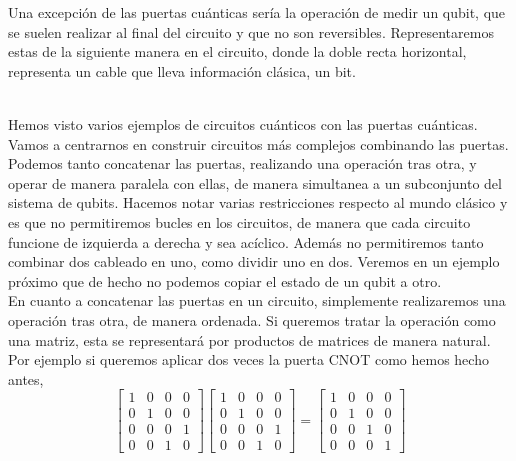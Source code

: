 \documentclass[a4paper]{article}
\numberwithin{equation}{section}
\begin{document}
Una excepción de las puertas cuánticas sería la operación de medir un qubit, que se suelen realizar al final del circuito y que no son reversibles. Representaremos estas de la siguiente manera en el circuito, donde la doble recta horizontal, representa un cable que lleva información clásica, un bit.
\begin{figure}[h]
\centering
{}
\end{figure}\\
Hemos visto varios ejemplos de circuitos cuánticos con las puertas cuánticas. Vamos a centrarnos en construir circuitos más complejos combinando las puertas. Podemos tanto concatenar las puertas, realizando una operación tras otra, y operar de manera paralela con ellas, de manera simultanea a un subconjunto del sistema de qubits. Hacemos notar varias restricciones respecto al mundo clásico y es que no permitiremos bucles en los circuitos, de manera que cada circuito funcione de izquierda a derecha y sea acíclico. Además no permitiremos tanto combinar dos cableado en uno, como dividir uno en dos. Veremos en un ejemplo próximo que de hecho no podemos copiar el estado de un qubit a otro.\\
\linebreak
En cuanto a concatenar las puertas en un circuito, simplemente realizaremos una operación tras otra, de manera ordenada. Si queremos tratar la operación como una matriz, esta se representará por productos de matrices de manera natural. Por ejemplo si queremos aplicar dos veces la puerta CNOT como hemos hecho antes,
\begin{equation}
\begin{bmatrix}
1 & 0 & 0 & 0 \\
0 & 1 & 0 & 0 \\
0 & 0 & 0 & 1 \\
0 & 0 & 1 & 0 
\end{bmatrix}
\begin{bmatrix}
1 & 0 & 0 & 0 \\
0 & 1 & 0 & 0 \\
0 & 0 & 0 & 1 \\
0 & 0 & 1 & 0 
\end{bmatrix} = 
\begin{bmatrix}
1 & 0 & 0 & 0 \\
0 & 1 & 0 & 0 \\
0 & 0 & 1 & 0 \\
0 & 0 & 0 & 1 
\end{bmatrix}
\end{equation}
\end{document}
